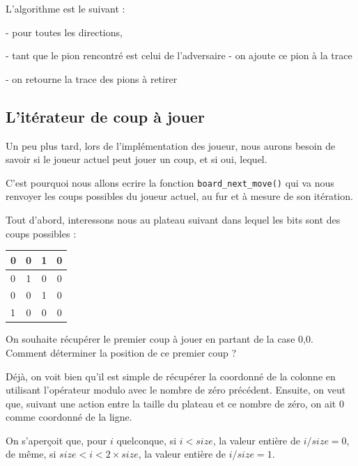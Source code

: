 \documentclass{report}
\begin{document}
L'algorithme est le suivant : \newline

- pour toutes les directions,

\tabto{1 cm}- tant que le pion rencontré est celui de l'adversaire
\tabto{1 cm}- on ajoute ce pion à la trace

- on retourne la trace des pions à retirer

\subsection{L'itérateur de coup à jouer}
Un peu plus tard, lors de l'implémentation des joueur, nous aurons besoin de savoir si le joueur actuel peut jouer un coup, et si oui, lequel.

C'est pourquoi nous allons ecrire la fonction \texttt{board\_next\_move()} qui va nous renvoyer les coups possibles du joueur actuel, au fur et à mesure de son itération.

Tout d'abord, interessons nous au plateau suivant dans lequel les bits sont des coups possibles :

\begin{center}
\renewcommand{\arraystretch} {1.5}
    \begin{tabular}{|p{0.2cm}|c|c|c|}
        \hline
        0 & 0 & 1 & 0\\
        \hline
        0 & 1 & 0 & 0 \\
        \hline
        0 & 0 & 1 & 0 \\
        \hline
        1 & 0 & 0 & 0 \\
        \hline
    \end{tabular}

\end{center}
\begin{center}
        \title{}
\end{center}

On souhaite récupérer le premier coup à jouer en partant de la case 0,0. Comment déterminer la position de ce premier coup ?

Déjà, on voit bien qu'il est simple de récupérer la coordonné de la colonne en utilisant l'opérateur modulo avec le nombre de zéro précédent. Ensuite, on veut que, suivant une action entre la taille du plateau et ce nombre de zéro, on ait 0 comme coordonné de la ligne.

On s'aperçoit que, pour $i$ quelconque, si $i<size$, la valeur entière de $i/size = 0$, de même, si $size<i<2\times size$, la valeur entière de $i/size = 1$.
\end{document}
